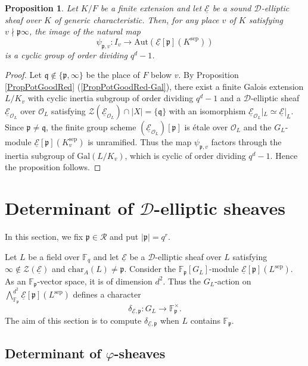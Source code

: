 \documentclass[10pt]{amsart}
\theoremstyle{plain}
\newtheorem{prop}[thm]{Proposition}
\theoremstyle{definition}
\newcommand{\Aut}{\mathrm{Aut}}
\newcommand{\chr}{\mathrm{char}}
\newcommand{\Gal}{\mathrm{Gal}}
\newcommand{\sep}{\mathrm{sep}}
\newcommand{\cO}{\mathcal{O}}
\newcommand{\cR}{\mathcal{R}}
\newcommand{\cZ}{\mathcal{Z}}
\newcommand{\ucE}{\underline{\mathcal{E}}}
\newcommand{\bF}{\mathbb{F}}
\newcommand{\sD}{\mathscr{D}}
\newcommand{\frp}{\mathfrak{p}}
\newcommand{\frq}{\mathfrak{q}}
\begin{document}
\begin{prop}\label{PropBoundMonodromy}
	Let $K/F$ be a finite extension and let $\ucE$ be a sound $\sD$-elliptic sheaf over $K$ of generic characteristic. 
	Then, for any place $v$ of $K$ satisfying $v\nmid \frp\infty$, the image of the natural map
	\[
	\psi_{\frp,v}:I_v\to \Aut(\ucE[\frp](K^\sep))
	\]
	is a cyclic group of order dividing $q^d-1$.
\end{prop}
\begin{proof}
	Let $\frq\notin\{\frp,\infty\}$ be the place of $F$ below $v$.
	By Proposition \ref{PropPotGoodRed} (\ref{PropPotGoodRed-Gal}), there exist a finite Galois extension $L/K_v$ with cyclic inertia subgroup of
	order dividing $q^d-1$ and a $\sD$-elliptic sheaf $\ucE_{\cO_L}$ over $\cO_L$ 
	satisfying $\cZ(\ucE_{\cO_L})\cap |X|=\{\frq\}$
	with an isomorphism $\ucE_{\cO_L}|_L\simeq \ucE|_L$.
	Since $\frp\neq \frq$, the finite group scheme $(\ucE_{\cO_L})[\frp]$ is \'{e}tale over $\cO_L$ and
	the $G_L$-module $\ucE[\frp](K^\sep_v)$ is unramified. Thus the map $\psi_{\frp,v}$ factors through the inertia subgroup of $\Gal(L/K_v)$,
	which is cyclic of order dividing $q^d-1$. Hence the proposition follows.
\end{proof}



\section{Determinant of $\sD$-elliptic sheaves}\label{SecDet}

In this section, we fix $\frp\in \cR$ and put $|\frp|=q^r$.

Let $L$ be a field over $\bF_q$ and let $\ucE$ be a $\sD$-elliptic sheaf over $L$ satisfying $\infty\notin\cZ(\ucE)$
and $\chr_A(L)\neq \frp$. 
Consider the $\bF_\frp[G_L]$-module $\ucE[\frp](L^\sep)$.
As an $\bF_\frp$-vector space, it is of dimension $d^2$.
Thus the $G_L$-action on $\bigwedge^{d^2}_{\bF_\frp}\ucE[\frp](L^\sep)$ defines a character
\[
\delta_{\ucE,\frp}:G_L\to \bF_\frp^\times.
\]
The aim of this section is to compute $\delta_{\ucE,\frp}$ when $L$ contains $\bF_\frp$.

\subsection{Determinant of $\varphi$-sheaves}\label{SubsecDetPhiShv}
\end{document}

